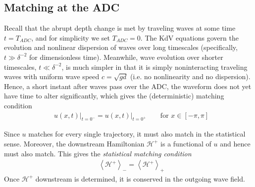 \documentclass[11pt]{article}
\newcommand{\mean}[1]{\left< #1 \right>}
\newcommand{\depth}{d}
\newcommand{\Ham}{\mathcal{H}}
\newcommand{\Hdn}{\Ham^{+}}
\newcommand{\meanup}[1]{\mean{#1}_{-}}
\newcommand{\meandn}[1]{\mean{#1}_{+}}
\begin{document}
\subsection{Matching at the ADC}

Recall that the abrupt depth change is met by traveling waves at some time $t = T_{ADC}$, and for simplicity we set $T_{ADC} = 0$. The KdV equations govern the evolution and nonlinear dispersion of waves over long timescales (specifically, $t \gg \delta^{-2}$ for dimensionless time). Meanwhile, wave evolution over shorter timescales, $t \ll \delta^{-2}$, is much simpler in that it is simply noninteracting traveling waves with uniform wave speed $c = \sqrt{g \depth}$ (i.e. no nonlinearity and no dispersion). Hence, a short instant after waves pass over the ADC, the waveform does not yet have time to alter significantly, which gives the (deterministic) matching condition
\begin{align}
&u(x,t) \vert_{t=0^-} = u(x,t) \vert_{t=0^+} \qquad \text{for } x \in [-\pi, \pi]
\end{align}

Since $u$ matches for every single trajectory, it must also match in the statistical sense. Moreover, the downstream Hamiltonian $\Hdn$ is a functional of $u$ and hence must also match. This gives the {\em statistical matching condition}
\begin{align}
\label{statmatch}
&\meanup{\Hdn} = \meandn{\Hdn}
\end{align}
Once $\Hdn$ downstream is determined, it is conserved in the outgoing wave field.

\end{document}
